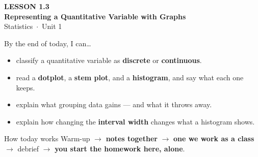 \documentclass[aspectratio=169, 11pt]{beamer}
\begin{document}
{
\begin{frame}[plain]
  \vspace{2.8cm}\hspace{0.55cm}%
  \begin{minipage}{0.9\textwidth}
    {\color{goldacc}\bfseries\small LESSON 1.3}\\[0.5cm]
    {\color{white}\bfseries\LARGE Representing a Quantitative Variable with Graphs}\\[1.2cm]
    {\color{skymid}\small Statistics~$\cdot$~Unit 1}
  \end{minipage}
\end{frame}
}

\newcommand{\redink}[1]{{\color{redacc}\bfseries #1}}

\begin{frame}[t, plain]
  By the end of today, I can\ldots
  \begin{itemize}\setlength{\itemsep}{5pt}
    \item classify a quantitative variable as \textbf{discrete} or \textbf{continuous}.
    \item read a \textbf{dotplot}, a \textbf{stem plot}, and a \textbf{histogram}, and say what
          each one keeps.
    \item explain what grouping data gains --- and what it throws away.
    \item explain how changing the \textbf{interval width} changes what a histogram shows.
  \end{itemize}
  \begin{block}{How today works}
    Warm-up $\to$ \textbf{notes together} $\to$ \textbf{one we work as a class} $\to$
    debrief $\to$ \textbf{you start the homework here, alone}.
  \end{block}
\end{frame}
\end{document}
